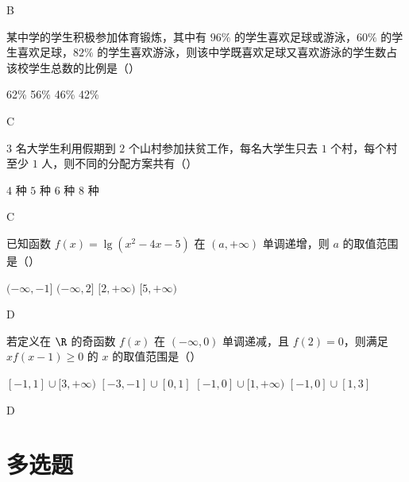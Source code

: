 \begin{answer}
    B
\end{answer}

\begin{problem}
某中学的学生积极参加体育锻炼，其中有 \(96\%\) 的学生喜欢足球或游泳，\(60\%\) 的学生喜欢足球，\(82\%\) 的学生喜欢游泳，则该中学既喜欢足球又喜欢游泳的学生数占该校学生总数的比例是（\quad）

\choices
    {62\%}
    {56\%}
    {46\%}
    {42\%}
\end{problem}

\begin{answer}
    C
\end{answer}

\begin{problem}
\(3\) 名大学生利用假期到 \(2\) 个山村参加扶贫工作，每名大学生只去 \(1\) 个村，每个村至少 \(1\) 人，则不同的分配方案共有（\quad）

\choices
    {\(4\) 种}
    {\(5\) 种}
    {\(6\) 种}
    {\(8\) 种}
\end{problem}

\begin{answer}
    C
\end{answer}

\begin{problem}
已知函数 \(f(x)=\lg(x^2-4x-5)\) 在 \((a,+\infty)\) 单调递增，则 \(a\) 的取值范围是（\quad）

\choices
    {\((-\infty,-1]\)}
    {\((-\infty,2]\)}
    {\([2,+\infty)\)}
    {\([5,+\infty)\)}
\end{problem}

\begin{answer}
    D
\end{answer}

\begin{problem}
若定义在 \(\R\) 的奇函数 \(f(x)\) 在 \((-\infty,0)\) 单调递减，且 \(f(2)=0\)，则满足 \(xf(x-1)\geqslant0\) 的 \(x\) 的取值范围是（\quad）

\choices
    {\([-1,1]\cup[3,+\infty)\)}
    {\([-3,-1]\cup[0,1]\)}
    {\([-1,0]\cup[1,+\infty)\)}
    {\([-1,0]\cup[1,3]\)}
\end{problem}

\begin{answer}
    D
\end{answer}

\section{多选题}

